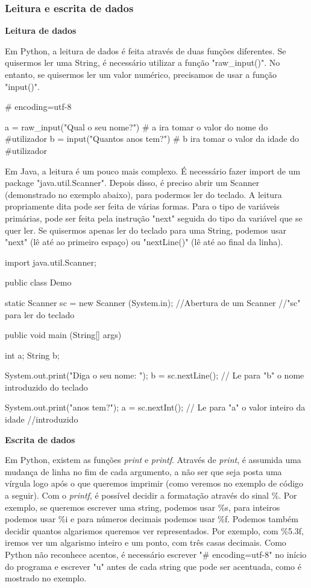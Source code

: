 \documentclass[11pt,openright,twoside]{report}
\begin{document}
\subsubsection{Leitura e escrita de dados}
\medskip

\textbf{Leitura de dados}
\smallskip

Em Python, a leitura de dados é feita através de duas funções diferentes. Se quisermos ler uma String, é necessário utilizar a função "raw\_input()". No entanto, se quisermos ler um valor numérico, precisamos de usar a função "input()".

\smallskip
\begin{Python}
# encoding=utf-8

a = raw_input("Qual o seu nome?") # a ira tomar o valor do nome do #utilizador
b = input("Quantos anos tem?")    # b ira tomar o valor da idade do #utilizador
\end{Python}
\smallskip

Em Java, a leitura é um pouco mais complexo. É necessário fazer import de um package "java.util.Scanner". Depois disso, é preciso abrir um Scanner (demonstrado no exemplo abaixo), para podermos ler do teclado. A leitura propriamente dita pode ser feita de várias formas. Para o tipo de variáveis primárias, pode ser feita pela instrução "next" seguida do tipo da variável que se quer ler. Se quisermos apenas ler do teclado para uma String, podemos usar "next" (lê até ao primeiro espaço) ou "nextLine()" (lê até ao final da linha).

\smallskip
\begin{Java}
import java.util.Scanner;

public class Demo{

	static Scanner sc = new Scanner (System.in); //Abertura de um Scanner //"sc" para ler do teclado
	
	public void main (String[] args){
		int a;
		String b;		
		
		System.out.print("Diga o seu nome: ");
		b = sc.nextLine(); // Le para "b" o nome introduzido do teclado
		
		System.out.print("\nQuantos anos tem?");
		a = sc.nextInt(); // Le para "a" o valor inteiro da idade //introduzido
	}
}
\end{Java}
\medskip

\textbf{Escrita de dados}
\smallskip

Em Python, existem as funções \textit{print} e \textit{printf}. Através de \textit{print}, é assumida uma mudança de linha no fim de cada argumento, a não ser que seja posta uma vírgula logo após o que queremos imprimir (como veremos no exemplo de código a seguir). Com o \textit{printf}, é possível decidir a formatação através do sinal \%. Por exemplo, se queremos escrever uma string, podemos usar \%s, para inteiros podemos usar \%i e para números decimais podemos usar \%f. Podemos também decidir quantos algarismos queremos ver representados. Por exemplo, com \%5.3f, iremos ver um algarismo inteiro e um ponto, com três casas decimais.
Como Python não reconhece acentos, é necessário escrever "\# encoding=utf-8" no início do programa e escrever "u" antes de cada string que pode ser acentuada, como é mostrado no exemplo.
\end{document}
